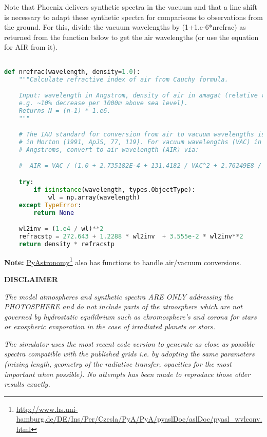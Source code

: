 \documentclass[12pt, a4paper]{article}
\begin{document}
Note that Phoenix delivers synthetic spectra in the vacuum and that a line
shift is necessary to adapt these synthetic spectra for comparisons to
observations from the ground. For this, divide the vacuum wavelengths by
(1+1.e-6*nrefrac) as returned from the function below to get the air 
wavelengths (or use the equation for AIR from it). 

\lstset{language=Pascal} 
\begin{lstlisting}[language=python, frame=single]  % Start your code-block

def nrefrac(wavelength, density=1.0):
    """Calculate refractive index of air from Cauchy formula.

    Input: wavelength in Angstrom, density of air in amagat (relative to STP,
    e.g. ~10% decrease per 1000m above sea level).
    Returns N = (n-1) * 1.e6. 
    """

    # The IAU standard for conversion from air to vacuum wavelengths is given
    # in Morton (1991, ApJS, 77, 119). For vacuum wavelengths (VAC) in
    # Angstroms, convert to air wavelength (AIR) via: 

    #  AIR = VAC / (1.0 + 2.735182E-4 + 131.4182 / VAC^2 + 2.76249E8 / VAC^4)

    try:
        if isinstance(wavelength, types.ObjectType):
            wl = np.array(wavelength)
    except TypeError:
        return None

    wl2inv = (1.e4 / wl)**2
    refracstp = 272.643 + 1.2288 * wl2inv  + 3.555e-2 * wl2inv**2
    return density * refracstp
\end{lstlisting}

\textbf{Note:} \href{http://www.hs.uni-hamburg.de/DE/Ins/Per/Czesla/PyA/PyA/pyaslDoc/aslDoc/pyasl_wvlconv.html}{PyAstronomy}\footnote{\url{http://www.hs.uni-hamburg.de/DE/Ins/Per/Czesla/PyA/PyA/pyaslDoc/aslDoc/pyasl_wvlconv.html}} also has functions to handle air/vacuum conversions. 


\textbf{DISCLAIMER}

\textit{
The model atmospheres and synthetic spectra ARE ONLY addressing the PHOTOSPHERE
and do not include parts of the atmosphere which are not governed by
hydrostatic equilibrium such as chromosphere's and corona for stars or
exospheric evaporation in the case of irradiated planets or stars. }

\textit{The simulator uses the most recent code version to generate as close as
possible spectra compatible with the published grids i.e. by adopting the
same parameters (mixing length, geometry of the radiative transfer, opacities
for the most important when possible). No attempts has been made to reproduce 
those older results exactly.}
\end{document}
